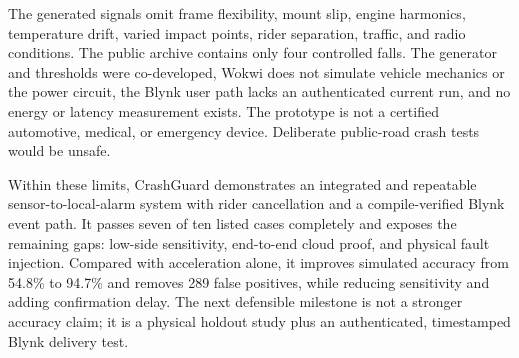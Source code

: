 \documentclass[12pt,a4paper]{article}
\begin{document}
The generated signals omit frame flexibility, mount slip, engine harmonics,
temperature drift, varied impact points, rider separation, traffic, and radio
conditions. The public archive contains only four controlled falls. The
generator and thresholds were co-developed, Wokwi does not simulate vehicle
mechanics or the power circuit, the Blynk user path lacks an authenticated
current run, and no energy or latency measurement exists. The prototype is
not a certified automotive, medical, or emergency device. Deliberate
public-road crash tests would be unsafe.

Within these limits, CrashGuard demonstrates an integrated and repeatable
sensor-to-local-alarm system with rider cancellation and a compile-verified
Blynk event path. It passes seven of ten listed cases completely and exposes
the remaining gaps: low-side sensitivity, end-to-end cloud proof, and physical
fault injection. Compared with acceleration alone, it improves simulated
accuracy from 54.8\% to 94.7\% and removes 289 false positives, while reducing
sensitivity and adding confirmation delay. The next defensible milestone is
not a stronger accuracy claim; it is a physical holdout study plus an
authenticated, timestamped Blynk delivery test.

\clearpage
{\small

}
\end{document}
